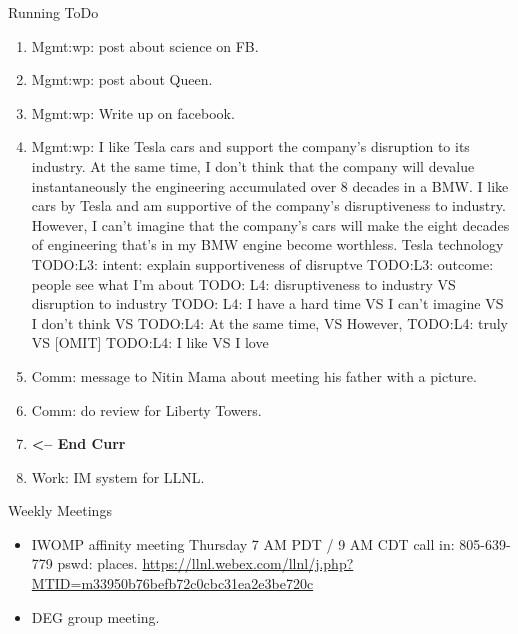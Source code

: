 \begin{columns}
\begin{column}{0.333\columnwidth}
\begin{columns}
\begin{column}{0.6\linewidth}
\begin{block}{Running ToDo}
\begin{enumerate}
           \item \tiny Mgmt:wp: post about science on FB. 
           \item \tiny Mgmt:wp: post about Queen. 

           \item \tiny Mgmt:wp: Write up on facebook.
           \item \tiny Mgmt:wp: I like Tesla cars and support the company's
            disruption to its industry. At the same time, I don’t think
            that the company will devalue instantaneously the engineering
            accumulated over 8 decades in a BMW.
            {I like cars by Tesla and am supportive of the company’s
              disruptiveness to industry. However, I can’t imagine
              that the company’s cars will make the eight decades of
              engineering that’s in my BMW engine become worthless.
             Tesla technology
             TODO:L3: intent: explain supportiveness of disruptve
             TODO:L3: outcome: people see what I’m about 
             TODO: L4: disruptiveness to industry VS disruption to industry 
             TODO: L4: I have a hard time VS I can’t imagine VS I don’t think  VS 
             TODO:L4: At the same time, VS However, 
             TODO:L4: truly VS [OMIT] 
             TODO:L4: I like VS I love} 

           \item \tiny Comm: message to Nitin Mama about meeting his
             father with a picture.

          \item \tiny Comm: do review for Liberty Towers. 
          \item \tiny \textbf{ <-- End Curr } 
          \item \tiny Work: IM system for LLNL.
        \end{enumerate}
      \end{block}
 

      \begin{block}{Weekly Meetings}
        \begin{itemize}
          \tiny \item \tiny IWOMP affinity meeting Thursday 7 AM PDT / 9 AM
          CDT call in: 805-639-779 pswd: places. \url{https://llnl.webex.com/llnl/j.php?MTID=m33950b76befb72c0cbc31ea2e3be720c}
        \item \tiny DEG group meeting.  
        \end{itemize}
      \end{block} 


\end{column}
\end{columns}
\end{column}
\end{columns}
